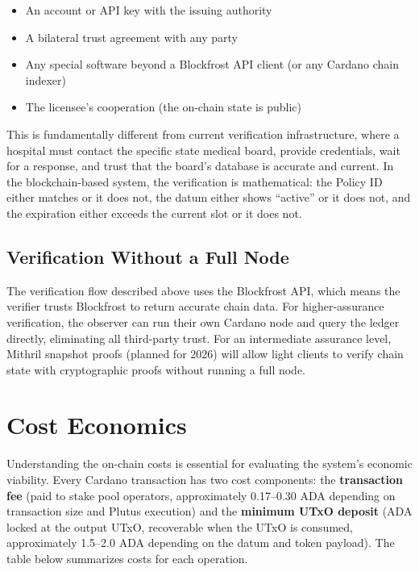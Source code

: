 \begin{itemize}[nosep]
  \item An account or API key with the issuing authority
  \item A bilateral trust agreement with any party
  \item Any special software beyond a Blockfrost API client (or any Cardano chain indexer)
  \item The licensee's cooperation (the on-chain state is public)
\end{itemize}

This is fundamentally different from current verification infrastructure, where a hospital must contact the specific state medical board, provide credentials, wait for a response, and trust that the board's database is accurate and current. In the blockchain-based system, the verification is mathematical: the Policy ID either matches or it does not, the datum either shows ``active'' or it does not, and the expiration either exceeds the current slot or it does not.

\subsection{Verification Without a Full Node}

The verification flow described above uses the Blockfrost API, which means the verifier trusts Blockfrost to return accurate chain data. For higher-assurance verification, the observer can run their own Cardano node and query the ledger directly, eliminating all third-party trust. For an intermediate assurance level, Mithril snapshot proofs (planned for 2026) will allow light clients to verify chain state with cryptographic proofs without running a full node.


\section{Cost Economics}
\label{sec:ch5-costs}

Understanding the on-chain costs is essential for evaluating the system's economic viability. Every Cardano transaction has two cost components: the \textbf{transaction fee} (paid to stake pool operators, approximately 0.17--0.30 ADA depending on transaction size and Plutus execution) and the \textbf{minimum UTxO deposit} (ADA locked at the output UTxO, recoverable when the UTxO is consumed, approximately 1.5--2.0 ADA depending on the datum and token payload). The table below summarizes costs for each operation.

